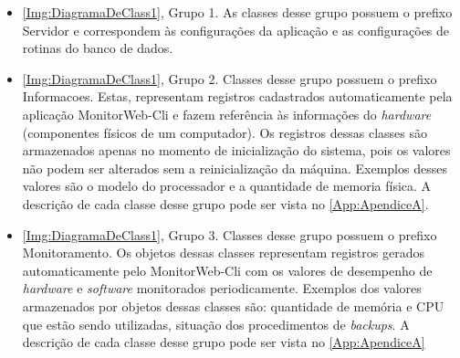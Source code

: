 \begin{itemize}
		\item \autoref{Img:DiagramaDeClass1}, Grupo 1. As classes desse grupo possuem o prefixo Servidor e correspondem às configurações da aplicação e as configurações de rotinas do banco de dados.
		\item \autoref{Img:DiagramaDeClass1}, Grupo 2. Classes desse grupo possuem o prefixo Informacoes. Estas, representam registros cadastrados automaticamente pela aplicação MonitorWeb-Cli e fazem referência às informações do \textit{hardware} (componentes físicos de um computador). Os registros dessas classes são armazenados apenas no momento de inicialização do sistema, pois os valores não podem ser alterados sem a reinicialização da máquina. Exemplos desses valores são o modelo do processador e a quantidade de memoria física. A descrição de cada classe desse grupo pode ser vista no \autoref{App:ApendiceA}.
		\item \autoref{Img:DiagramaDeClass1}, Grupo 3. Classes desse grupo possuem o prefixo Monitoramento. Os objetos dessas classes representam registros gerados automaticamente pelo MonitorWeb-Cli com os valores de desempenho de \textit{hardware} e \textit{software} monitorados periodicamente. Exemplos dos valores armazenados por objetos dessas classes são: quantidade de memória e CPU que estão sendo utilizadas, situação dos procedimentos de \textit{backups}. A descrição de cada classe desse grupo pode ser vista no \autoref{App:ApendiceA}
\end{itemize}


